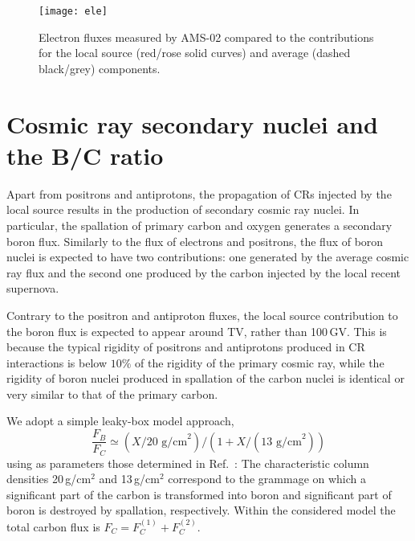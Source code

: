 \documentclass[prd,aps,twocolumn]{revtex4}
\def\be{\begin{equation}}
\def\ee{\end{equation}}
\begin{document}
\begin{figure}
\texttt{[image: ele]}
\caption{Electron fluxes measured by AMS-02 compared to the 
contributions for the local source (red/rose solid curves) and average (dashed black/grey) components. 
\label{fig:ele}}
\end{figure}








\section{Cosmic ray secondary nuclei and the B/C ratio}



Apart from positrons and antiprotons, the propagation of CRs injected by 
the local source results in the production of secondary cosmic ray nuclei. 
In particular, the spallation of primary carbon and oxygen
generates a secondary boron flux. Similarly to the flux of electrons and 
positrons, the flux of boron nuclei is expected to have two contributions: 
one generated by the average cosmic ray flux and the second one produced 
by the carbon injected by the local recent supernova.  

Contrary to the positron and antiproton fluxes, the local source contribution 
to the boron flux is expected to appear around TV, rather than 100\,GV.
This is because the typical rigidity of positrons and antiprotons produced in 
CR interactions is below $10\%$ of the rigidity of the primary cosmic ray, 
while the rigidity of boron nuclei produced in spallation of the carbon nuclei 
is identical or very similar to that of the primary carbon. 

We adopt a simple leaky-box model approach, 
%
\be
\frac{F_B}{F_C}\simeq (X/20\mbox{ g/cm}^2)/\left(1+X/(13\mbox{ g/cm}^2)\right)
\ee
%
using as parameters those determined in Ref.~\cite{Webber03,Blum13}:
The characteristic column densities 20\,g/cm$^2$ and 13\,g/cm$^2$ correspond 
to the grammage on which a significant part of the carbon is transformed into 
boron and significant part of boron is destroyed by spallation, respectively. 
Within the considered model the total carbon flux is $F_C=F^{(1)}_C+F^{(2)}_C$. 
\end{document}
